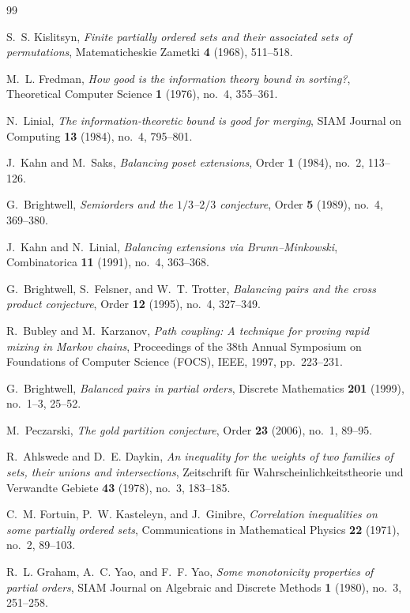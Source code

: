 \documentclass[11pt]{article}
\theoremstyle{definition}
\theoremstyle{remark}
\begin{document}
\begin{thebibliography}{99}

S.~S. Kislitsyn,
\emph{Finite partially ordered sets and their associated sets of
permutations},
Matematicheskie Zametki \textbf{4} (1968), 511--518.

M.~L. Fredman,
\emph{How good is the information theory bound in sorting?},
Theoretical Computer Science \textbf{1} (1976), no.~4, 355--361.

N.~Linial,
\emph{The information-theoretic bound is good for merging},
SIAM Journal on Computing \textbf{13} (1984), no.~4, 795--801.

J.~Kahn and M.~Saks,
\emph{Balancing poset extensions},
Order \textbf{1} (1984), no.~2, 113--126.

G.~Brightwell,
\emph{Semiorders and the $1/3$--$2/3$ conjecture},
Order \textbf{5} (1989), no.~4, 369--380.

J.~Kahn and N.~Linial,
\emph{Balancing extensions via Brunn--Minkowski},
Combinatorica \textbf{11} (1991), no.~4, 363--368.

G.~Brightwell, S.~Felsner, and W.~T. Trotter,
\emph{Balancing pairs and the cross product conjecture},
Order \textbf{12} (1995), no.~4, 327--349.

R.~Bubley and M.~Karzanov,
\emph{Path coupling: A technique for proving rapid mixing in Markov
chains},
Proceedings of the 38th Annual Symposium on Foundations of Computer
Science (FOCS), IEEE, 1997, pp.~223--231.

G.~Brightwell,
\emph{Balanced pairs in partial orders},
Discrete Mathematics \textbf{201} (1999), no.~1--3, 25--52.

M.~Peczarski,
\emph{The gold partition conjecture},
Order \textbf{23} (2006), no.~1, 89--95.

R.~Ahlswede and D.~E. Daykin,
\emph{An inequality for the weights of two families of sets, their
unions and intersections},
Zeitschrift f\"ur Wahrscheinlichkeitstheorie und Verwandte Gebiete
\textbf{43} (1978), no.~3, 183--185.

C.~M. Fortuin, P.~W. Kasteleyn, and J.~Ginibre,
\emph{Correlation inequalities on some partially ordered sets},
Communications in Mathematical Physics \textbf{22} (1971), no.~2,
89--103.

R.~L. Graham, A.~C. Yao, and F.~F. Yao,
\emph{Some monotonicity properties of partial orders},
SIAM Journal on Algebraic and Discrete Methods \textbf{1} (1980),
no.~3, 251--258.

\end{thebibliography}
\end{document}
